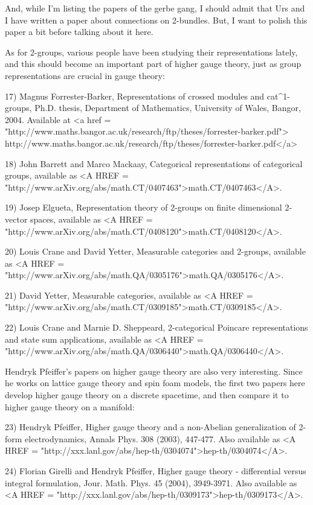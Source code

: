 And, while I'm listing the papers of the gerbe gang, I should admit that 
Urs and I have written a paper about connections on 2-bundles.  But, I
want to polish this paper a bit before talking about it here.

As for 2-groups, various people have been studying their representations
lately, and this should become an important part of higher gauge theory, 
just as group representations are crucial in gauge theory:

17) Magnus Forrester-Barker, Representations of crossed modules and 
cat^{1}-groups, Ph.D. thesis, Department of Mathematics, University of
Wales, Bangor, 2004.  Available at 
<a href = "http://www.maths.bangor.ac.uk/research/ftp/theses/forrester-barker.pdf">
http://www.maths.bangor.ac.uk/research/ftp/theses/forrester-barker.pdf</a>

18) John Barrett and Marco Mackaay, Categorical representations of 
categorical groups, available as <A HREF = "http://www.arXiv.org/abs/math.CT/0407463">math.CT/0407463</A>.

19) Josep Elgueta, Representation theory of 2-groups on finite dimensional
2-vector spaces, available as <A HREF = "http://www.arXiv.org/abs/math.CT/0408120">math.CT/0408120</A>.
 
20) Louis Crane and David Yetter, Measurable categories and 2-groups,
available as 
<A HREF = "http://www.arXiv.org/abs/math.QA/0305176">math.QA/0305176</A>.

21) David Yetter, Measurable categories, 
available as
<A HREF = "http://www.arXiv.org/abs/math.CT/0309185">math.CT/0309185</A>.

22) Louis Crane and Marnie D. Sheppeard, 2-categorical Poincare
representations and state sum applications, available as
<A HREF = "http://www.arXiv.org/abs/math.QA/0306440">math.QA/0306440</A>.

Hendryk Pfeiffer's papers on higher gauge theory are also very 
interesting.  Since he works on lattice gauge theory and spin foam
models, the first two papers here develop higher gauge theory on a
discrete spacetime, and then compare it to higher gauge theory on a 
manifold:

23) Hendryk Pfeiffer, Higher gauge theory and a non-Abelian generalization of
2-form electrodynamics, Annals Phys. 308 (2003), 447-477.  Also available as
<A HREF = "http://xxx.lanl.gov/abs/hep-th/0304074">hep-th/0304074</A>.

24) Florian Girelli and Hendryk Pfeiffer, Higher gauge theory - differential 
versus integral formulation, Jour. Math. Phys. 45 (2004), 3949-3971.  
Also available as <A HREF = "http://xxx.lanl.gov/abs/hep-th/0309173">hep-th/0309173</A>.

